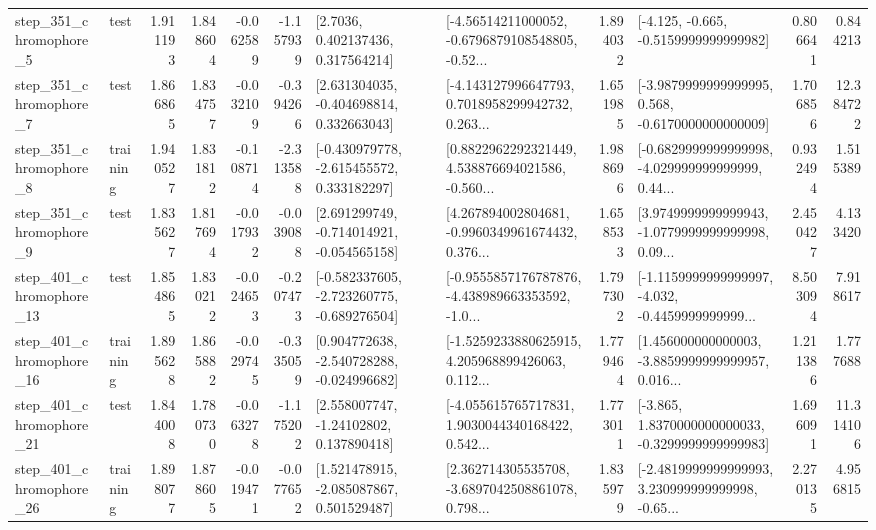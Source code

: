\begin{tabular}{llrrrrllrlrr}
   step\_351\_chromophore\_5 &      test &      1.911193 &    1.848604 &     -0.062589 & -1.157939 &          [2.7036, 0.402137436, 0.317564214] &  [-4.56514211000052, -0.6796879108548805, -0.52... &       1.894032 &              [-4.125, -0.665, -0.5159999999999982] &            0.806641 &          0.844213 \\
   step\_351\_chromophore\_7 &      test &      1.866865 &    1.834757 &     -0.032109 & -0.394266 &    [2.631304035, -0.404698814, 0.332663043] &  [-4.143127996647793, 0.7018958299942732, 0.263... &       1.651985 &  [-3.9879999999999995, 0.568, -0.6170000000000009] &            1.706856 &         12.384722 \\
   step\_351\_chromophore\_8 &  training &      1.940527 &    1.831812 &     -0.108714 & -2.313588 &   [-0.430979778, -2.615455572, 0.333182297] &  [0.8822962292321449, 4.538876694021586, -0.560... &       1.988696 &  [-0.6829999999999998, -4.029999999999999, 0.44... &            0.932494 &          1.515389 \\
   step\_351\_chromophore\_9 &      test &      1.835627 &    1.817694 &     -0.017932 & -0.039088 &   [2.691299749, -0.714014921, -0.054565158] &  [4.267894002804681, -0.9960349961674432, 0.376... &       1.658533 &  [3.9749999999999943, -1.0779999999999998, 0.09... &            2.450427 &          4.133420 \\
  step\_401\_chromophore\_13 &      test &      1.854865 &    1.830212 &     -0.024653 & -0.207473 &  [-0.582337605, -2.723260775, -0.689276504] &  [-0.9555857176787876, -4.438989663353592, -1.0... &       1.797302 &  [-1.1159999999999997, -4.032, -0.4459999999999... &            8.503094 &          7.918617 \\
  step\_401\_chromophore\_16 &  training &      1.895628 &    1.865882 &     -0.029745 & -0.335059 &   [0.904772638, -2.540728288, -0.024996682] &  [-1.5259233880625915, 4.205968899426063, 0.112... &       1.779464 &  [1.456000000000003, -3.8859999999999957, 0.016... &            1.211386 &          1.777688 \\
  step\_401\_chromophore\_21 &      test &      1.844008 &    1.780730 &     -0.063278 & -1.175202 &     [2.558007747, -1.24102802, 0.137890418] &  [-4.055615765717831, 1.9030044340168422, 0.542... &       1.773011 &  [-3.865, 1.8370000000000033, -0.3299999999999983] &            1.696091 &         11.314106 \\
  step\_401\_chromophore\_26 &  training &      1.898077 &    1.878605 &     -0.019471 & -0.077652 &    [1.521478915, -2.085087867, 0.501529487] &  [2.362714305535708, -3.6897042508861078, 0.798... &       1.835979 &  [-2.4819999999999993, 3.230999999999998, -0.65... &            2.270135 &          4.956815 \\

\end{tabular}
